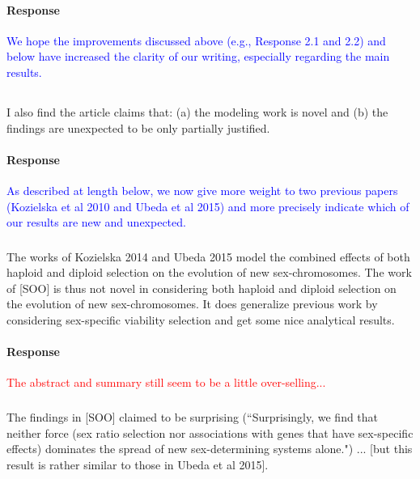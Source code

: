 \documentclass[10pt,letterpaper]{article}
\begin{document}
\noindent\paragraph{Response}
\textcolor{blue}{We hope the improvements discussed above (e.g., Response 2.1 and 2.2) and below have increased the clarity of our writing, especially regarding the main results.}

\noindent\subsection{}
I also find the article claims that: (a) the modeling work is novel and (b) the findings are unexpected to be only partially justified.

\noindent\paragraph{Response}
\textcolor{blue}{As described at length below, we now give more weight to two previous papers (Kozielska et al 2010 and Ubeda et al 2015) and more precisely indicate which of our results are new and unexpected.}

\noindent\subsubsection{}
The works of Kozielska 2014 and Ubeda 2015 model the combined effects of both haploid and diploid selection on the evolution of new sex-chromosomes. The work of [SOO] is thus not novel in considering both haploid and diploid selection on the evolution of new sex-chromosomes. It does generalize previous work by considering sex-specific viability selection and get some nice analytical results.

\noindent\paragraph{Response}
\textcolor{red}{The abstract and summary still seem to be a little over-selling...}
\textcolor{blue}{}

\noindent\subsubsection{}
The findings in [SOO] claimed to be surprising (``Surprisingly, we find that neither force (sex ratio selection nor associations with genes that have sex-specific effects) dominates the spread of new sex-determining systems alone.") ... [but this result is rather similar to those in Ubeda et al 2015]. 
\end{document}
